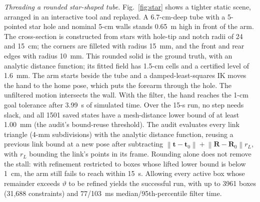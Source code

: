 \documentclass[journal]{IEEEtran}
\theoremstyle{definition}
\newcommand{\norm}[1]{\left\lVert #1\right\rVert}
\newcommand{\Rot}{\mathbf{R}}
\begin{document}
\emph{Threading a rounded star-shaped tube.} Fig.~\ref{fig:star} shows a tighter static scene,
arranged in an interactive tool and replayed. A 6.7-cm-deep tube with a 5-pointed star hole and
nominal 5-cm walls stands 0.65~m high in front of the arm. The cross-section is constructed from
stars with hole-tip and notch radii of 24 and 15~cm; the corners are filleted with radius 15~mm,
and the front and rear edges with radius 10~mm. This rounded solid is the ground truth, with an
analytic distance function; its fitted field has 1.5-cm cells and a certified level of 1.6~mm.
The arm starts beside the tube and a damped-least-squares IK moves the hand to the home pose,
which puts the forearm through the hole. The unfiltered motion intersects the wall.
With the filter, the hand reaches the 1-cm goal tolerance after 3.99~s of simulated time.
Over the 15-s run, no step needs slack, and all 1501 saved states have a mesh-distance lower bound
of at least 1.00~mm (the audit's bound-reuse threshold). The audit evaluates every link triangle
(4-mm subdivisions) with the analytic distance function, reusing a previous link bound at a new
pose after subtracting $\norm{\mathbf t-\mathbf t_0}+\norm{\Rot-\Rot_0}r_L$, with $r_L$ bounding the
link's points in its frame.
Rounding alone does not remove the stall: with refinement restricted
to boxes whose lifted lower bound is below 1~cm, the arm still fails to reach within 15~s.
Allowing every active box whose remainder exceeds $\vartheta$ to be refined yields the successful
run, with up to 3961 boxes (31{,}688 constraints) and 77/103~ms median/95th-percentile filter time.
\end{document}
